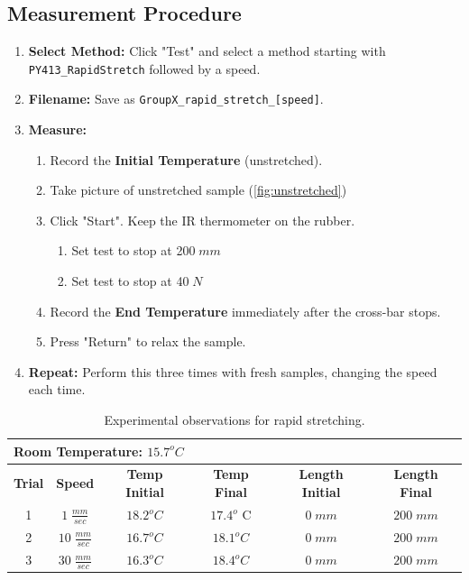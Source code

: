 \documentclass[12pt]{article}     %
\begin{document}
\subsection*{Measurement Procedure}
\begin{enumerate}[resume]
    \item \textbf{Select Method:} Click "Test" and select a method starting with \texttt{PY413\_RapidStretch} followed by a speed.
    \item \textbf{Filename:} Save as \texttt{GroupX\_rapid\_stretch\_[speed]}.
    \item \textbf{Measure:}
    \begin{enumerate}
        \item Record the \textbf{Initial Temperature} (unstretched).
        \item Take picture of unstretched sample (\ref{fig:unstretched}) 
        \item Click "Start". Keep the IR thermometer on the rubber.
        \begin{enumerate}
            \item Set test to stop at 200$\;mm$
            \item Set test to stop at 40$\;N$
        \end{enumerate}
        \item Record the \textbf{End Temperature} immediately after the cross-bar stops.
        \item Press "Return" to relax the sample.
    \end{enumerate}
    \item \textbf{Repeat:} Perform this three times with fresh samples, changing the speed each time.
\end{enumerate}

\begin{table}[ht]
    \centering
    \label{tab:exp1}
    \caption{Experimental observations for rapid stretching.}
    \renewcommand{\arraystretch}{1.5}
    \begin{tabular}{@{}c c c c c c@{}}
        \midrule
        \multicolumn{6}{l}{\textbf{Room Temperature: $15.7^{o}C$}} \\
        \midrule
        \textbf{Trial} & \textbf{Speed} & \textbf{Temp Initial} & \textbf{Temp Final} & \textbf{Length Initial} & \textbf{Length Final}\\
        \midrule
        1 & $1\;\frac{mm}{sec}$ & $18.2^{o} C$ & $17.4^{o}$ C& $0\; mm$ & $200\;mm$ \\
        \midrule
        2 & $10\;\frac{mm}{sec}$ & $16.7^{o} C$ & $18.1^{o} C$ & $0\; mm$ & $200\;mm$\\
        \midrule
        3 & $30\;\frac{mm}{sec}$ & $16.3^{o} C$& $18.4^{o} C$&$0\; mm$ & $200\;mm$\\
        \bottomrule
    \end{tabular}
\end{table}
\end{document}
